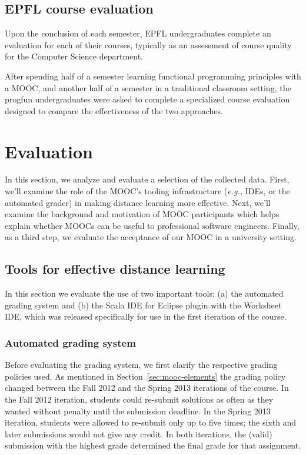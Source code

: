 \documentclass{sig-alternate}
\begin{document}
\subsection{EPFL course evaluation}

Upon the conclusion of each semester, EPFL undergraduates complete an evaluation for
each of their courses, typically as an assessment of course quality for the Computer
Science department.

After spending half of a semester learning functional programming principles with a
MOOC, and another half of a semester in a traditional classroom setting, the progfun
undergraduates were asked to complete a specialized course evaluation designed to compare
the effectiveness of the two approaches.

\section{Evaluation}
\label{sec:eval}

In this section, we analyze and evaluate a selection of the collected data.
First, we'll examine the role of the MOOC's tooling infrastructure
(\emph{e.g.,} IDEs, or the automated grader) in making distance learning more effective.
Next, we'll examine the background and motivation of MOOC participants which helps
explain whether MOOCs can be useful to professional software engineers. Finally,
as a third step, we evaluate the acceptance of our MOOC in a university setting.

\subsection{Tools for effective distance learning}

In this section we evaluate the use of two important tools: (a) the automated
grading system and (b) the Scala IDE for Eclipse plugin with the Worksheet IDE,
which was released specifically for use in the first iteration of the course.

\subsubsection{Automated grading system}

Before evaluating the grading system, we first clarify the respective grading
policies used. As mentioned in Section~\ref{sec:mooc-elements} the grading
policy changed between the Fall 2012 and the Spring 2013 iterations of the
course. In the Fall 2012 iteration, students could re-submit solutions as
often as they wanted without penalty until the submission deadline. In the
Spring 2013 iteration, students were allowed to re-submit only up to five
times; the sixth and later submissions would not give any credit. In both
iterations, the (valid) submission with the highest grade determined the final
grade for that assignment.
\end{document}
